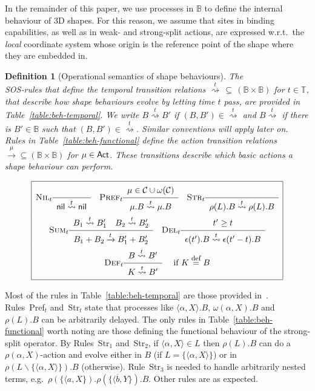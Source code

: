 \documentclass[11pt]{article}
\newcommand{\Act}{{\sf Act}}
\newcommand{\channels}{{\cal C}}
\newcommand{\bpa}{\mathbb{B}}
\newcommand{\nil}{{\sf nil}}
\def\sos#1#2{{\def\arraystretch{1.6}\begin{array}{c}#1\\\hline
#2\end{array}}}
\newcommand{\nar}[1]{\xrightarrow{#1}}
\newcommand{\wnar}[1]{\stackrel{#1}{\rightsquigarrow}}
\def\name#1{\mbox{\sc #1}}
\newcommand{\equaldef}{\stackrel{\mbox{\footnotesize{def}}}{=}}
\newcommand{\timedomain}{{\mathbb T}}
\newtheorem{definition}{Definition}
\begin{document}
In the remainder of this paper, we use processes in $\bpa$ to define the internal behaviour of
3D shapes. For this reason, we assume that sites in binding capabilities, as well as in weak- and
strong-split actions, are expressed w.r.t.\ the {\em local} coordinate system whose origin is
the reference point of the shape where they are embedded in.

\begin{definition}[Operational semantics of shape behaviours]
\label{def:behaviours-semantics}
The\\
\noindent SOS-rules that define the {\em temporal transition} relations $\wnar{t} \, \subseteq \,
(\bpa \times \bpa)$ for $t \in \timedomain$, that describe how shape behaviours evolve by letting
time $t$ pass, are provided in Table~\ref{table:beh-temporal}. We write $B \wnar{t} B'$ if
$(B,B')\in \wnar{t}$ and $B \wnar{t}$ if there is $B'\in \bpa$ such that $(B,B')\in \wnar{t}$.
Similar conventions will apply later on.
Rules in Table~\ref{table:beh-functional} define the {\em action transition} relations $\nar{\mu}
\subseteq (\bpa \times \bpa)$ for $\mu \in \Act$. These transitions describe which basic actions a
shape behaviour can perform.
\end{definition}

{\small
\begin{table}
\[
\begin{array}{|c|}
\hline
\name{Nil$_t$}\sos{}{\nil \wnar{t} \nil}
\quad
\name{Pref$_t$} \sos{ \mu \in \channels \cup \omega(\channels)}
{\mu.B \wnar{t} \mu.B}
\quad
\name{Str$_t$} \sos{} {\rho(L).B \wnar{t} \rho(L).B} \\
\name{Sum$_t$} \sos{B_1 \wnar{t} B'_1 \quad B_2 \wnar{t} B'_2}
{B_1 + B_2 \nar{t} B'_1 + B'_2}
\quad
\name{Del$_t$} \sos{t' \geq t} {\epsilon(t').B \wnar{t} \epsilon(t' - t).B}  \\
\name{Def$_t$} \sos{B \wnar{t} B'}
{K \wnar{t} B'} \quad \mbox{ if } K \equaldef B\\
\hline
\end{array}\]
\caption{Temporal behaviour of $\bpa$'s terms}
\label{table:beh-temporal}
\end{table}
}

Most of the rules in Table~\ref{table:beh-temporal} are those provided in~\cite{Yi1990}.
Rules~\name{Pref$_t$} and~\name{Str$_t$} state that processes like $\langle \alpha, X \rangle.B$,
$\omega(\alpha,X).B$ and $\rho(L).B$ can be arbitrarily delayed. The only rules in
Table~\ref{table:beh-functional} worth noting are those defining the functional behaviour of the
strong-split operator.
By Rules~\name{Str$_{1}$} and~\name{Str$_{2}$}, if  $\langle \alpha,X \rangle \in L$ then
$\rho(L).B$ can do a $\rho(\alpha,X)$-action and evolve either
in $B$ (if $L=\{\langle \alpha,X \rangle\}$) or in $\rho(L\backslash \{\langle \alpha,X
\rangle\}).B$ (otherwise). Rule~\name{Str$_{3}$} is needed to handle arbitrarily nested terms,
e.g.\ $\rho(\{\langle a, X \}).\rho(\{\langle \overline{b}, Y \}).B$. Other rules are as expected.
\end{document}

